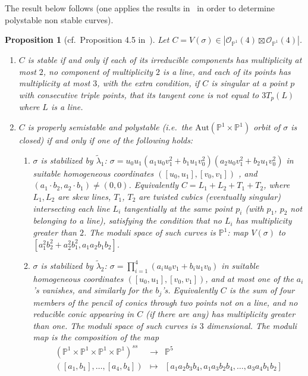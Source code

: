 \documentclass[11pt]{amsart}
\numberwithin{equation}{section}
\theoremstyle{plain}
\newtheorem{proposition}[theorem]{Proposition}
\theoremstyle{remark}
\theoremstyle{definition}
\newcommand{\Aut}{\mathrm{Aut}}
\newcommand{\cO}{{\mathscr O}}
\newcommand{\lra}{\longrightarrow}
\newcommand{\PP}{{\mathbb P}}
\newcommand{\wt}{\widetilde}
\begin{document}
%
The  result below follows (one applies the results in~\cite{luna} in order to determine polystable non stable curves).
%
\begin{proposition}[cf.~Proposition 4.5 in~\cite{shah}]\label{prp:git44}
%
Let $C=V(\sigma)\in | \cO_{\PP^1}(4)\boxtimes\cO_{\PP^1}(4)|$. 
%
\begin{enumerate}
%
\item
%
$C$ is stable if and only if each of its irreducible components has multiplicity at most $2$, no component of multiplicity $2$ is a line, and  each of its points has multiplicity at most $3$, with the extra condition, if $C$ is singular at a point $p$ with consecutive triple points, that its tangent cone is \emph{not} equal to $3T_p(L)$ where $L$ is a line.  
%
\item
%
$C$ is properly semistable and polystable (i.e.~the $\Aut(\PP^1\times\PP^1)$ orbit of $\sigma$ is closed) if and only if one of the following holds:
%
\begin{enumerate}
%
\item
%
\emph{$\sigma$ is stabilized by $\wt{\lambda}_1$:} $\sigma=u_0 u_1(a_1 u_0 v_1^2+b_1 u_1 v_0^2)(a_2 u_0 v_1^2+b_2 u_1 v_0^2)$ in suitable homogeneous coordinates $([u_0,u_1],[v_0,v_1])$ , and $(a_1\cdot b_2,a_2\cdot b_1)\not=(0,0)$. Equivalently $C=L_1+L_2+T_1+T_2$, where $L_1,L_2$ are skew lines, $T_1$, $T_2$ are  twisted cubics (eventually singular) intersecting each line  $L_i$  tangentially at the same point $p_i$ (with $p_1$, $p_2$ not belonging to a line), satisfying the condition that no $L_i$ has multiplicity greater than $2$. The moduli space of such curves is $\PP^1$: map  $V(\sigma)$ to $[a_1^2b_2^2+a_2^2b_1^2,a_1 a_2 b_1 b_2]$. 
%
\item
%
\emph{$\sigma$ is stabilized by $\wt{\lambda}_2$:} $\sigma=\prod_{i=1}^4(a_i u_0 v_1+b_i u_1 v_0)$ in suitable homogeneous coordinates $([u_0,u_1],[v_0,v_1])$, and at most one of the $a_i$'s vanishes, and similarly for the $b_j$'s. Equivalently $C$ is the sum of four members of the pencil of conics through  two points not on a line, and no 
 reducible conic appearing in $C$ (if there are any) has multiplicity greater than one.
The moduli space of such curves  is $3$ dimensional. The moduli map is the composition of the map
%
\begin{equation*}
%
\begin{matrix}
%
(\PP^1\times\PP^1\times\PP^1\times\PP^1)^{ss} & \lra & \PP^5 \\
%
([a_1,b_1],\ldots,[a_4,b_4]) & \mapsto & [a_1 a_2 b_3 b_4,a_1 a_3 b_2 b_4,\ldots,a_3 a_4 b_1 b_2]

\end{matrix}
\end{equation*}
\end{enumerate}
\end{enumerate}
\end{proposition}
\end{document}
